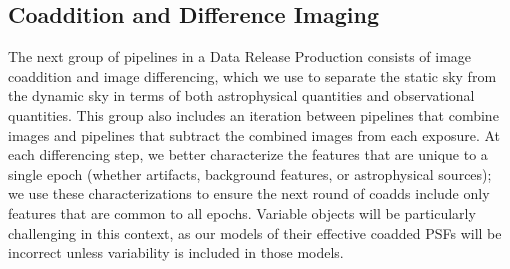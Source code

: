 \subsection{Coaddition and Difference Imaging}
\label{sec:drp_coaddition_and_diffim}

The next group of pipelines in a Data Release Production consists of image coaddition and image differencing, which we use to separate the static sky from the dynamic sky in terms of both astrophysical quantities and observational quantities.  This group also includes an iteration between pipelines that combine images and pipelines that subtract the combined images from each exposure.  At each differencing step, we better characterize the features that are unique to a single epoch (whether artifacts, background features, or astrophysical sources); we use these characterizations to ensure the next round of coadds include only features that are common to all epochs.  Variable objects will be particularly challenging in this context, as our models of their effective coadded PSFs will be incorrect unless variability is included in those models.

